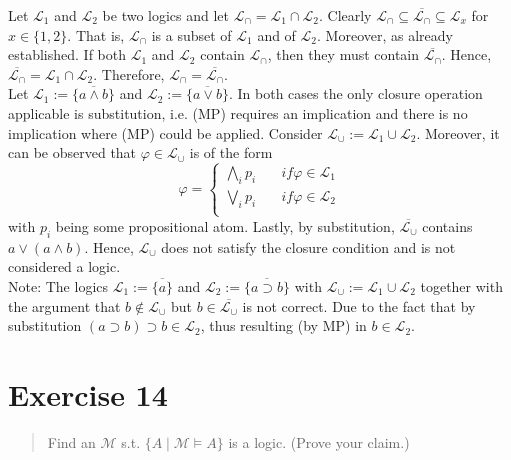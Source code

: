 \documentclass[11pt,a4paper]{article}
\newcommand{\lto}{\supset}
\begin{document}
Let $\mathcal{L}_1$ and $\mathcal{L}_2$ be two logics and let $\mathcal{L}_{\cap} = \mathcal{L}_1 \cap \mathcal{L}_2$.  
Clearly $\mathcal{L}_{\cap} \subseteq \overline{\mathcal{L}_{\cap}} \subseteq \mathcal{L}_x$ for $x \in \{1,2\}$. That is, $\mathcal{L}_{\cap}$ is a subset of $\mathcal{L}_1$ and of $\mathcal{L}_{2}$. Moreover, as already established. If both $\mathcal{L}_1$ and $\mathcal{L}_{2}$ contain $\mathcal{L}_{\cap}$, then they must contain $\overline{\mathcal{L}_{\cap}}$. Hence, $\overline{\mathcal{L}_{\cap}}=\mathcal{L}_1 \cap \mathcal{L}_2$. Therefore, $\mathcal{L}_{\cap} = \overline{\mathcal{L}_{\cap}}$. \\


Let $\mathcal{L}_1:=\overline{\{a \land b\}}$ and $\mathcal{L}_2:=\overline{\{a \lor b\}}$.  In both cases the only closure operation applicable is substitution, i.e. (MP) requires an implication and there is no implication where (MP) could be applied. Consider $\mathcal{L}_{\cup}:= \mathcal{L}_1 \cup \mathcal{L}_2$. Moreover, it can be observed that $\varphi \in \mathcal{L}_{\cup}$ is of the form
\begin{equation*}
\varphi = \begin{cases}
\bigwedge_{i} p_i  & \quad \mathit{if} \varphi \in \mathcal{L}_1 \\
\bigvee_{i} p_i & \quad \mathit{if} \varphi \in \mathcal{L}_2 \\
\end{cases}
\end{equation*}
with $p_i$ being some propositional atom. 
Lastly, by substitution, $\overline{\mathcal{L}_{\cup}}$ contains $a \lor (a \land b)$. Hence, $\mathcal{L}_{\cup}$ does not satisfy the closure condition and is not considered a logic.\\

Note: The logics $\mathcal{L}_1:=\overline{\{a\}}$ and $\mathcal{L}_2:=\overline{\{a \lto b\}}$ with $\mathcal{L}_{\cup}:=\mathcal{L}_1 \cup \mathcal{L}_2$ together with the argument that $b \nin \mathcal{L}_{\cup}$ but $b \in \overline{\mathcal{L}_{\cup}}$ is not correct. Due to the fact that by substitution $(a \lto b) \lto b \in \mathcal{L}_2$, thus resulting (by MP) in $b \in \mathcal{L}_2$.

\section*{Exercise 14}
\begin{quote}
Find an $\mathcal{M}$ s.t. $\{A \mid \mathcal{M} \models A\}$ is a logic. (Prove your claim.)
\end{quote}
\end{document}
